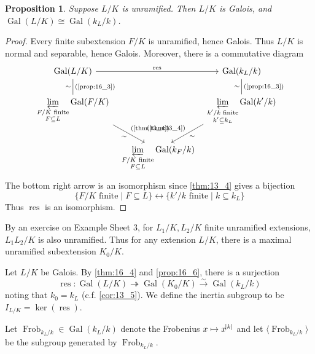 \documentclass[11pt]{article}
\theoremstyle{definition}
\theoremstyle{plain}
\newtheorem{proposition}[definition]{Proposition}
\theoremstyle{remark}
\DeclareMathOperator{\Gal}{Gal}
\DeclareMathOperator{\res}{res}
\DeclareMathOperator{\Frob}{Frob}
\begin{document}
\begin{proposition}\label{prop:16_6}
    Suppose $L/K$ is unramified. Then $L/K$ is Galois, and $\Gal(L/K) \cong \Gal(k_L / k)$.
\end{proposition}
\begin{proof}
    Every finite subextension $F/K$ is unramified, hence Galois. Thus $L/K$ is normal and separable, hence Galois. Moreover, there is a commutative diagram
    \begin{equation*}
        \begin{tikzcd}[column sep=tiny]
        \Gal(L/K) \arrow[rr, "\res"] \arrow[d, dash, "\sim"', "\text{(\ref{prop:16_3})}"] & & \Gal(k_L/k) \arrow[d, dash, "\sim"', "\text{(\ref{prop:16_3})}"]\\
        \displaystyle\varprojlim_{\substack{F/K \text{ finite}\\ F \subseteq L}} \Gal(F/K) \arrow[rd, "\sim"', "\text{(\ref{thm:13_4})}"]& & \displaystyle\varprojlim_{\substack{k'/k \text{ finite}\\ k' \subseteq k_L}} \Gal(k'/k) \arrow[ld, "\sim", "\text{(\ref{thm:13_4})}"'] \\
        & \displaystyle\varprojlim_{\substack{F/K \text{ finite}\\ F \subseteq L}} \Gal(k_F/k) &
    \end{tikzcd}
    \end{equation*}
    The bottom right arrow is an isomorphism since \autoref{thm:13_4} gives a bijection
    \begin{equation*}
        \{F/K \text{ finite} \mid F \subseteq L\} \longleftrightarrow \{k'/k \text{ finite} \mid k \subseteq k_L\}
    \end{equation*}
    Thus $\res$ is an isomorphism.
\end{proof}

By an exercise on Example Sheet 3, for $L_1/K, L_2/K$ finite unramified extensions, $L_1 L_2/K$ is also unramified. Thus for any extension $L/K$, there is a maximal unramified subextension $K_0/K$.

Let $L/K$ be Galois. By \autoref{thm:16_4} and \autoref{prop:16_6}, there is a surjection
\begin{equation*}
    \res : \Gal(L/K) \twoheadrightarrow \Gal(K_0/K) \xrightarrow{\sim} \Gal(k_L/k)
\end{equation*}
noting that $k_0 = k_L$ (c.f. \autoref{cor:13_5}). We define the inertia subgroup to be $I_{L/K} = \ker(\res)$.

Let $\Frob_{k_L/k} \in \Gal(k_L/k)$ denote the Frobenius $x \mapsto x^{\abs{k}}$ and let $\langle \Frob_{k_L/k} \rangle$ be the subgroup generated by $\Frob_{k_L/k}$.
\end{document}
